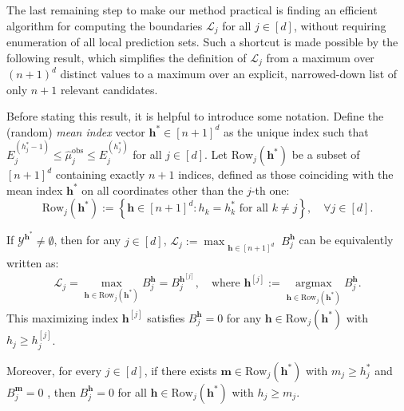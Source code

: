 The last remaining step to make our method practical is finding an efficient algorithm for computing the boundaries $\mathcal{L}_j$ for all $j \in [d]$, without requiring enumeration of all local prediction sets. 
Such a shortcut is made possible by the following result, which simplifies the definition of $\mathcal{L}_j$ from a maximum over $(n+1)^d$ distinct values to a maximum over an explicit, narrowed-down list of only $n+1$ relevant candidates.

Before stating this result, it is helpful to introduce some notation. 
Define the (random) \emph{mean index} vector $\mathbf{h}^* \in [n+1]^d$ as the unique index such that $E^{(h^*_j-1)}_j \le \hat{\mu}_j^\mathrm{obs} \le E^{(h^*_j)}_j$ for all $j \in [d]$.
Let $\mathrm{Row}_j(\mathbf{h}^*)$ be a subset of $[n+1]^d$ containing exactly $n+1$ indices, defined as those coinciding with the mean index $\mathbf{h}^*$ on all coordinates other than the $j$-th one:
\[
\mathrm{Row}_j(\mathbf{h}^*):=\left\{\mathbf{h}\in[n{+}1]^d : h_k = h^*_k \text{ for all } k\neq j \right\}, \quad\forall j \in [d].
\]

\begin{lemma}
If $\mathcal{Y}^{\mathbf{h}^*} \neq \emptyset$, then for any $j \in [d]$, $\mathcal{L}_j := \max_{\substack{\mathbf{h} \in [n+1]^d}}B^{\mathbf{h}}_j$ can be equivalently written as:
    \begin{align*}
    \mathcal{L}_j= \max_{\mathbf{h} \in \mathrm{Row}_j(\mathbf{h}^*)} B^{\mathbf{h}}_j = B^{\mathbf{h}^{[j]}}_j,
      \quad
      \text{where }\mathbf{h}^{[j]} := \operatorname*{argmax}_{\mathbf{h} \in \mathrm{Row}_j(\mathbf{h}^*)} B^{\mathbf{h}}_j.
    \end{align*}
    This maximizing index $\mathbf{h}^{[j]}$ satisfies $B^{\mathbf{h}}_j= 0$ for any $\mathbf{h} \in \mathrm{Row}_j(\mathbf{h}^*)$ with $h_j \geq h^{[j]}_j$. 
    
    Moreover, for every $j \in [d]$, if there exists $\mathbf{m}\in\mathrm{Row}_j(\mathbf{h}^*)$ with $m_j\geq h^*_j$ and $B^{\mathbf{m}}_j=0$
    , then $B^{\mathbf{h}}_j=0$ for all $\mathbf{h}\in\mathrm{Row}_j(\mathbf{h}^*)$ with $h_j \geq m_j$.
    \label{lem:reduction-search}
\end{lemma}

